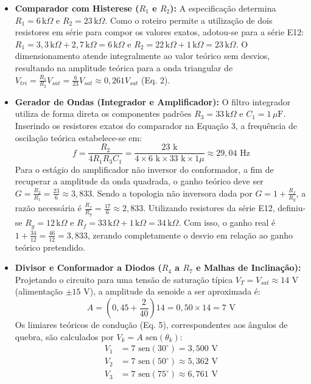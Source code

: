 \documentclass[11pt,a4paper]{article}
\begin{document}
\begin{itemize}

    \item \textbf{Comparador com Histerese ($R_1$ e $R_2$):} \hfill\break
    A especificação determina $R_1 = 6\,\mathrm{k}\Omega$ e $R_2 = 23\,\mathrm{k}\Omega$. Como o roteiro permite a utilização de dois resistores em série para compor os valores exatos, adotou-se para a série E12: $R_1 = 3{,}3\,\mathrm{k}\Omega + 2{,}7\,\mathrm{k}\Omega = 6\,\mathrm{k}\Omega$ e $R_2 = 22\,\mathrm{k}\Omega + 1\,\mathrm{k}\Omega = 23\,\mathrm{k}\Omega$. O dimensionamento atende integralmente ao valor teórico sem desvios, resultando na amplitude teórica para a onda triangular de $V_{tri} = \frac{R_1}{R_2}V_{sat} = \frac{6}{23}V_{sat} \approx 0{,}261 V_{sat}$ (Eq. 2).

    \item \textbf{Gerador de Ondas (Integrador e Amplificador):} \hfill\break
    O filtro integrador utiliza de forma direta os componentes padrões $R_3 = 33\,\mathrm{k}\Omega$ e $C_1 = 1\,\mu\mathrm{F}$. Inserindo os resistores exatos do comparador na Equação 3, a frequência de oscilação teórica estabelece-se em:
    \[ f = \frac{R_2}{4 R_1 R_3 C_1} = \frac{23\text{ k}}{4 \times 6\text{ k} \times 33\text{ k} \times 1\mu} \approx 29{,}04\text{ Hz} \]
    Para o estágio do amplificador não inversor do conformador, a fim de recuperar a amplitude da onda quadrada, o ganho teórico deve ser $G = \frac{R_2}{R_1} = \frac{23}{6} \approx 3{,}833$. Sendo a topologia não inversora dada por $G = 1 + \frac{R_f}{R_g}$, a razão necessária é $\frac{R_f}{R_g} = \frac{17}{6} \approx 2{,}833$. Utilizando resistores da série E12, definiu-se $R_g = 12\,\mathrm{k}\Omega$ e $R_f = 33\,\mathrm{k}\Omega + 1\,\mathrm{k}\Omega = 34\,\mathrm{k}\Omega$. Com isso, o ganho real é $1 + \frac{34}{12} = \frac{46}{12} = 3{,}833$, zerando completamente o desvio em relação ao ganho teórico pretendido.

    \item \textbf{Divisor e Conformador a Diodos ($R_4$ a $R_7$ e Malhas de Inclinação):} \hfill\break
    Projetando o circuito para uma tensão de saturação típica $V_T = V_{sat} \approx 14\text{ V}$ (alimentação $\pm15\text{ V}$), a amplitude da senoide a ser aproximada é:
    \[ A = \left(0{,}45 + \frac{2}{40}\right)14 = 0{,}50 \times 14 = 7\text{ V} \]
    Os limiares teóricos de condução (Eq. 5), correspondentes aos ângulos de quebra, são calculados por $V_k = A \text{ sen}(\theta_k)$:
    \begin{align*}
        V_1 &= 7 \text{ sen}(30^\circ) = 3{,}500\text{ V} \\
        V_2 &= 7 \text{ sen}(50^\circ) \approx 5{,}362\text{ V} \\
        V_3 &= 7 \text{ sen}(75^\circ) \approx 6{,}761\text{ V}
    \end{align*}
    

\end{itemize}
\end{document}
